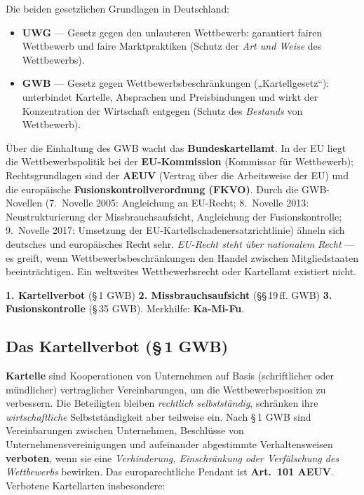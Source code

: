 \documentclass[11pt, a4paper]{article}
\begin{document}
Die beiden gesetzlichen Grundlagen in Deutschland:

\begin{itemize}
  \item \textbf{UWG} --- Gesetz gegen den unlauteren Wettbewerb: garantiert fairen
    Wettbewerb und faire Marktpraktiken (Schutz der \emph{Art und Weise} des Wettbewerbs).
  \item \textbf{GWB} --- Gesetz gegen Wettbewerbsbeschränkungen („Kartellgesetz``):
    unterbindet Kartelle, Absprachen und Preisbindungen und wirkt der Konzentration der
    Wirtschaft entgegen (Schutz des \emph{Bestands} von Wettbewerb).
\end{itemize}

Über die Einhaltung des GWB wacht das \textbf{Bundeskartellamt}. In der EU liegt die
Wettbewerbspolitik bei der \textbf{EU-Kommission} (Kommissar für Wettbewerb);
Rechtsgrundlagen sind der \textbf{AEUV} (Vertrag über die Arbeitsweise der EU) und die
europäische \textbf{Fusionskontrollverordnung (FKVO)}. Durch die GWB-Novellen (7.~Novelle
2005: Angleichung an EU-Recht; 8.~Novelle 2013: Neustrukturierung der Missbrauchsaufsicht,
Angleichung der Fusionskontrolle; 9.~Novelle 2017: Umsetzung der
EU-Kartellschadenersatzrichtlinie) ähneln sich deutsches und europäisches Recht sehr.
\emph{EU-Recht steht über nationalem Recht} --- es greift, wenn Wettbewerbsbeschränkungen
den Handel zwischen Mitgliedstaaten beeinträchtigen. Ein weltweites Wettbewerbsrecht oder
Kartellamt existiert nicht.

\begin{merksatz}[title={\bfseries Die drei Säulen des GWB}]
\textbf{1. Kartellverbot} (\S\,1 GWB) \quad \textbf{2. Missbrauchsaufsicht}
(\S\S\,19\,ff. GWB) \quad \textbf{3. Fusionskontrolle} (\S\,35 GWB).
Merkhilfe: \textbf{Ka-Mi-Fu}.
\end{merksatz}

\subsection{Das Kartellverbot (\S\,1 GWB)}

\textbf{Kartelle} sind Kooperationen von Unternehmen auf Basis (schriftlicher oder
mündlicher) vertraglicher Vereinbarungen, um die Wettbewerbsposition zu verbessern. Die
Beteiligten bleiben \emph{rechtlich selbstständig}, schränken ihre \emph{wirtschaftliche}
Selbstständigkeit aber teilweise ein. Nach \S\,1 GWB sind Vereinbarungen zwischen
Unternehmen, Beschlüsse von Unternehmensvereinigungen und aufeinander abgestimmte
Verhaltensweisen \textbf{verboten}, wenn sie eine \emph{Verhinderung, Einschränkung oder
Verfälschung des Wettbewerbs} bewirken. Das europarechtliche Pendant ist
\textbf{Art.~101 AEUV}. Verbotene Kartellarten insbesondere:
\end{document}
